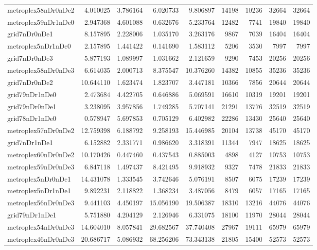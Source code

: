 \begin{longtable}{|l|r|r|r|r|r|r|r|r|}
metroplex58nDr0nDe2 & 4.010025 & 3.786164 & 6.020733 & 9.806897 & 14198 & 10236 & 32664 & 32664 \\
metroplex59nDr1nDe0 & 2.947368 & 4.601088 & 0.632676 & 5.233764 & 12482 & 7741 & 19840 & 19840 \\
grid7nDr0nDe1 & 8.157895 & 2.228006 & 1.035170 & 3.263176 & 9867 & 7039 & 16404 & 16404 \\
metroplex5nDr1nDe0 & 2.157895 & 1.441422 & 0.141690 & 1.583112 & 5206 & 3530 & 7997 & 7997 \\
grid7nDr0nDe3 & 5.877193 & 1.089997 & 1.031662 & 2.121659 & 9290 & 7453 & 20256 & 20256 \\
metroplex58nDr0nDe3 & 6.614035 & 2.000713 & 8.375547 & 10.376260 & 14382 & 10855 & 35236 & 35236 \\
grid7nDr0nDe2 & 10.644110 & 1.623474 & 1.823707 & 3.447181 & 10366 & 7856 & 20644 & 20644 \\
grid79nDr1nDe0 & 2.473684 & 4.422705 & 0.646886 & 5.069591 & 16610 & 10319 & 19201 & 19201 \\
grid79nDr0nDe1 & 3.238095 & 3.957856 & 1.749285 & 5.707141 & 21291 & 13776 & 32519 & 32519 \\
grid78nDr1nDe0 & 0.578947 & 5.697853 & 0.705129 & 6.402982 & 22286 & 13430 & 25640 & 25640 \\
metroplex57nDr0nDe2 & 12.759398 & 6.188792 & 9.258193 & 15.446985 & 20104 & 13738 & 45170 & 45170 \\
grid7nDr1nDe1 & 6.152882 & 2.331771 & 0.986620 & 3.318391 & 11344 & 7947 & 18625 & 18625 \\
metroplex60nDr0nDe2 & 10.170426 & 0.447460 & 0.437543 & 0.885003 & 4898 & 4127 & 10753 & 10753 \\
metroplex59nDr0nDe3 & 6.847118 & 1.497437 & 8.421495 & 9.918932 & 9327 & 7478 & 21833 & 21833 \\
metroplex5nDr0nDe1 & 14.431078 & 1.333545 & 3.742646 & 5.076191 & 8507 & 6075 & 17239 & 17239 \\
metroplex5nDr1nDe1 & 9.892231 & 2.118822 & 1.368234 & 3.487056 & 8479 & 6057 & 17165 & 17165 \\
metroplex56nDr0nDe3 & 9.441103 & 4.450197 & 15.056190 & 19.506387 & 18310 & 13216 & 44076 & 44076 \\
grid79nDr1nDe1 & 5.751880 & 4.204129 & 2.126946 & 6.331075 & 18100 & 11970 & 28044 & 28044 \\
metroplex54nDr0nDe3 & 14.604010 & 8.057841 & 29.682567 & 37.740408 & 27967 & 19111 & 65979 & 65979 \\
metroplex46nDr0nDe3 & 20.686717 & 5.086932 & 68.256206 & 73.343138 & 21805 & 15400 & 52573 & 52573 \\

\end{longtable}
